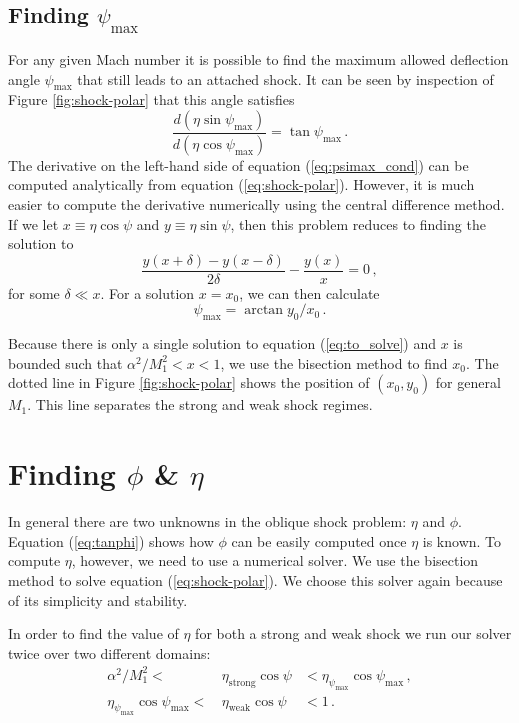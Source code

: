 \documentclass[twocolumn]{aastex631}
\begin{document}
\subsection{Finding $\psi_\text{max}$}
For any given Mach number it is possible to find the maximum allowed deflection angle $\psi_\text{max}$ that still leads to an attached shock. It can be seen by inspection of Figure \ref{fig:shock-polar} that this angle satisfies
\begin{equation}
    \frac{d (\eta\sin\psi_\text{max})}{d (\eta\cos\psi_\text{max})} = \tan{\psi_\text{max}}\, .\label{eq:psimax_cond}
\end{equation}
The derivative on the left-hand side of equation (\ref{eq:psimax_cond}) can be computed analytically from equation (\ref{eq:shock-polar}). However, it is much easier to compute the derivative numerically using the central difference method. If we let $x\equiv\eta\cos\psi$ and $y\equiv\eta\sin\psi$, then this problem reduces to finding the solution to
\begin{equation}
    \frac{y(x+\delta)-y(x-\delta)}{2\delta} - \frac{y(x)}{x} = 0\, ,\label{eq:to_solve}
\end{equation}
for some $\delta \ll x$. For a solution $x=x_0$, we can then calculate
\begin{equation}
    \psi_\text{max} = \arctan{y_0/x_0}\, .
\end{equation}

Because there is only a single solution to equation (\ref{eq:to_solve}) and $x$ is bounded such that $\alpha^2/M_1^2 < x < 1$, we use the bisection method to find $x_0$. The dotted line in Figure \ref{fig:shock-polar} shows the position of $(x_0,y_0)$ for general $M_1$. This line separates the strong and weak shock regimes.

\section{Finding $\phi$ \& $\eta$}
In general there are two unknowns in the oblique shock problem: $\eta$ and $\phi$. Equation (\ref{eq:tanphi}) shows how $\phi$ can be easily computed once $\eta$ is known. To compute $\eta$, however, we need to use a numerical solver. We use the bisection method to solve equation (\ref{eq:shock-polar}). We choose this solver again because of its simplicity and stability.

In order to find the value of $\eta$ for both a strong and weak shock we run our solver twice over two different domains:
\begin{eqnarray}
    \alpha^2/M_1^2 <\,& \eta_\text{strong}\cos\psi &< \eta_{\psi_\text{max}}\cos\psi_\text{max}\,  ,\\
    \eta_{\psi_\text{max}}\cos\psi_\text{max} <\,& \eta_\text{weak}\cos\psi &< 1\, .
\end{eqnarray}
\end{document}

